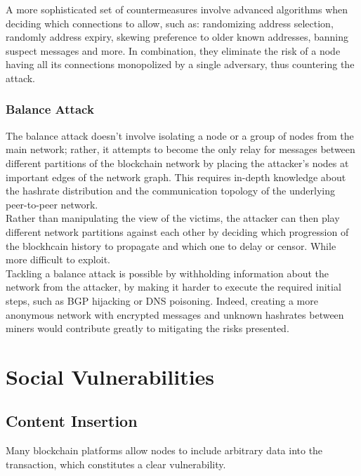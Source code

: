 \documentclass[12pt,a4paper]{article}
\begin{document}
A more sophisticated set of countermeasures involve advanced algorithms when deciding which connections to allow, such as: randomizing address selection, randomly address expiry, skewing preference to older known addresses, banning suspect messages and more. In combination, they eliminate the risk of a node having all its connections monopolized by a single adversary, thus countering the attack.\\

\subsubsection{Balance Attack}

The balance attack doesn't involve isolating a node or a group of nodes from the main network; rather, it attempts to become the only relay for messages between different partitions of the blockchain network by placing the attacker's nodes at important edges of the network graph. This requires in-depth knowledge about the hashrate distribution and the communication topology of the underlying peer-to-peer network.\\

Rather than manipulating the view of the victims, the attacker can then play different network partitions against each other by deciding which progression of the blockhcain history to propagate and which one to delay or censor. While more difficult to exploit.\\

Tackling a balance attack is possible by withholding information about the network from the attacker, by making it harder to execute the required initial steps, such as BGP hijacking or DNS poisoning. Indeed, creating a more anonymous network with encrypted messages and unknown hashrates between miners would contribute greatly to mitigating the risks presented.\\

\section{Social Vulnerabilities}

\subsection{Content Insertion}

Many blockchain platforms allow nodes to include arbitrary data into the transaction, which constitutes a clear vulnerability.\\
\end{document}
